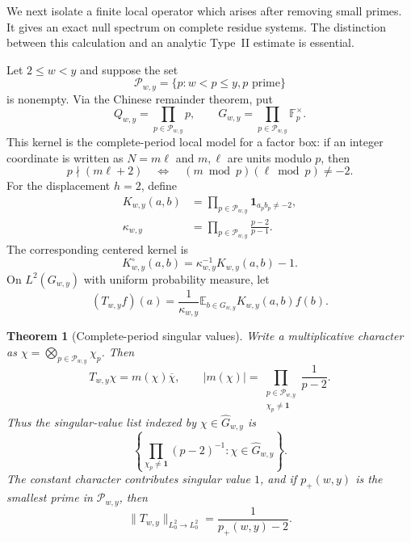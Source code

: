 \documentclass[11pt]{article}
\newtheorem{theorem}{Theorem}[section]
\theoremstyle{definition}
\theoremstyle{remark}
\newcommand{\F}{\mathbb F}
\newcommand{\one}{\mathbf 1}
\newcommand{\cP}{\mathcal P}
\begin{document}
We next isolate a finite local operator which arises after removing small primes.  It gives an exact null spectrum on complete residue systems.  The distinction between this calculation and an analytic Type~II estimate is essential.

Let $2\le w<y$ and suppose the set
\[
 \cP_{w,y}=\{p:w<p\le y, p\text{ prime}\}
\]
is nonempty.  Via the Chinese remainder theorem, put
\begin{equation}\label{eq:bilinear-group}
 Q_{w,y}=\prod_{p\in\cP_{w,y}}p,
 \qquad
 G_{w,y}=\prod_{p\in\cP_{w,y}}\F_p^\times.
\end{equation}
This kernel is the complete-period local model for a factor box: if an integer coordinate is written as $N=m\ell$ and $m,\ell$ are units modulo $p$, then
\begin{equation}\label{eq:factor-kernel-origin}
 p\nmid(m\ell+2)
 \quad\Longleftrightarrow\quad
 (m\bmod p)(\ell\bmod p)\ne-2.
\end{equation}
For the displacement $h=2$, define
\begin{align}
 K_{w,y}(a,b)&=
 \prod_{p\in\cP_{w,y}}\one_{a_pb_p\ne-2},\label{eq:bilinear-kernel}\\
 \kappa_{w,y}&=
 \prod_{p\in\cP_{w,y}}\frac{p-2}{p-1}.\label{eq:bilinear-kappa}
\end{align}
The corresponding centered kernel is
\begin{equation}\label{eq:centered-bilinear-kernel}
 K_{w,y}^{\circ}(a,b)=\kappa_{w,y}^{-1}K_{w,y}(a,b)-1.
\end{equation}
On $L^2(G_{w,y})$ with uniform probability measure, let
\begin{equation}\label{eq:bilinear-operator}
 (T_{w,y}f)(a)=\frac1{\kappa_{w,y}}
 \mathbb E_{b\in G_{w,y}}K_{w,y}(a,b)f(b).
\end{equation}

\begin{theorem}[Complete-period singular values]\label{thm:bilinear-singular-values}
Write a multiplicative character as $\chi=\bigotimes_{p\in\cP_{w,y}}\chi_p$.  Then
\begin{equation}\label{eq:T-character}
 T_{w,y}\chi=m(\chi)\overline\chi,
 \qquad
 |m(\chi)|=
 \prod_{\substack{p\in\cP_{w,y}\\\chi_p\ne\one}}
 \frac1{p-2}.
\end{equation}
Thus the singular-value list indexed by $\chi\in\widehat G_{w,y}$ is
\begin{equation}\label{eq:singular-value-list}
 \left\{
 \prod_{\chi_p\ne\one}(p-2)^{-1}:\chi\in\widehat G_{w,y}
 \right\}.
\end{equation}
The constant character contributes singular value $1$, and if $p_+(w,y)$ is the smallest prime in $\cP_{w,y}$, then
\begin{equation}\label{eq:mean-zero-operator-norm}
 \|T_{w,y}\|_{L^2_0\to L^2_0}
 =\frac1{p_+(w,y)-2}.
\end{equation}
\end{theorem}
\end{document}
